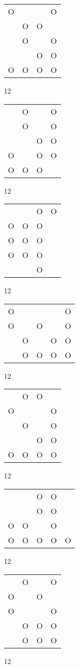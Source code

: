 \begin{tabular}{|m{0.2cm}m{0.2cm}m{0.2cm}m{0.2cm}|}\hline
O& & &O\\
 &O&O& \\
 &O& &O\\
 & &O&O\\
O&O&O&O\\
\hline\end{tabular}12
\begin{tabular}{|m{0.2cm}m{0.2cm}m{0.2cm}m{0.2cm}|}\hline
 &O& &O\\
 &O& &O\\
 & &O&O\\
O& &O&O\\
O&O&O& \\
\hline\end{tabular}12
\begin{tabular}{|m{0.2cm}m{0.2cm}m{0.2cm}m{0.2cm}|}\hline
 & &O&O\\
O&O&O& \\
O&O&O& \\
O&O&O& \\
 & &O& \\
\hline\end{tabular}12
\begin{tabular}{|m{0.2cm}m{0.2cm}m{0.2cm}m{0.2cm}m{0.2cm}|}\hline
O& & & &O\\
O& &O& &O\\
 &O& &O&O\\
 &O&O&O&O\\
\hline\end{tabular}12
\begin{tabular}{|m{0.2cm}m{0.2cm}m{0.2cm}m{0.2cm}|}\hline
 &O&O& \\
O& & &O\\
 &O& &O\\
 & &O&O\\
O&O&O&O\\
\hline\end{tabular}12
\begin{tabular}{|m{0.2cm}m{0.2cm}m{0.2cm}m{0.2cm}m{0.2cm}|}\hline
 & &O&O& \\
 & &O&O& \\
O&O& &O& \\
O&O&O&O&O\\
\hline\end{tabular}12
\begin{tabular}{|m{0.2cm}m{0.2cm}m{0.2cm}m{0.2cm}|}\hline
 &O& &O\\
O& &O& \\
O& & &O\\
 &O&O&O\\
 &O&O&O\\
\hline\end{tabular}12
